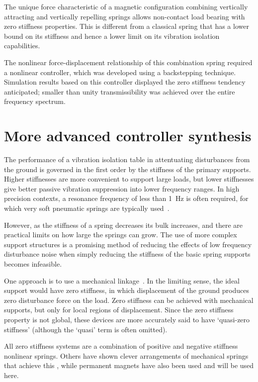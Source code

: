 The unique force characteristic of a magnetic configuration
combining vertically attracting and vertically repelling springs
allows non-contact load bearing with zero stiffness properties. This
is different from a classical spring that has a lower bound on its
stiffness and hence a lower limit on its vibration isolation
capabilities.

The nonlinear force-displacement relationship of this combination
spring required a nonlinear controller, which was developed using a
backstepping technique. Simulation results based on this controller
displayed the zero stiffness tendency anticipated; smaller than
unity transmissibility was achieved over the entire frequency
spectrum.





\section{More advanced controller synthesis}

The performance of a vibration isolation table in attentuating
disturbances from the ground is governed in the first order by the
stiffness of the primary supports. Higher stiffnesses are more
convenient to support large loads, but lower stiffnesses give better
passive vibration suppression into lower frequency ranges. In high
precision contexts, a resonance frequency of less than \SI{1}{Hz} is
often required, for which very soft pneumatic springs are typically
used~\cite{kawashima2007}.

However, as the stiffness of a spring decreases its bulk increases,
and there are practical limits on how large the springs can
grow. The use of more complex support structures is a promising method of
reducing the effects of low frequency disturbance noise when simply
reducing the stiffness of the basic spring supports becomes
infeasible.

One approach is to use a mechanical linkage~\cite{winterflood2001}. In
the limiting sense, the ideal support would have zero stiffness, in
which displacement of the ground produces zero disturbance force on
the load. Zero stiffness can be achieved with mechanical supports, but
only for local regions of displacement. Since the zero stiffness
property is not global, these devices are more accurately said to have
`quasi-zero stiffness' (although the `quasi' term is often omitted).

All zero stiffness systems are a combination of positive and negative
stiffness nonlinear springs. Others have shown clever arrangements of
mechanical springs that achieve this
\cite{alabuzhev1989,carrella2007,lee2007}, while permanent magnets
have also been used \cite{robertson2006,nijsse2001} and will be used
here.

